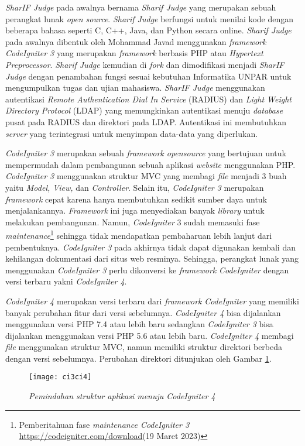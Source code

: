 \textit{SharIF Judge} pada awalnya bernama \textit{Sharif Judge} yang merupakan sebuah perangkat lunak \textit{open source}. \textit{Sharif Judge} berfungsi untuk menilai kode dengan beberapa bahasa seperti C, C++, Java, dan Python secara online. \textit{Sharif Judge} pada awalnya dibentuk oleh Mohammad Javad menggunakan \textit{framework} \textit{CodeIgniter 3} yang merupakan \textit{framework} berbasis PHP atau \textit{Hypertext Preprocessor}. \textit{Sharif Judge} kemudian di \textit{fork} dan dimodifikasi menjadi \textit{SharIF Judge} dengan penambahan fungsi sesuai kebutuhan Informatika UNPAR untuk mengumpulkan tugas dan ujian mahasiswa. \textit{SharIF Judge} menggunakan autentikasi \textit{Remote Authentication Dial In Service} (RADIUS) dan \textit{Light Weight Directory Protocol} (LDAP) yang memungkinkan autentikasi menuju \textit{database} pusat pada RADIUS dan direktori pada LDAP. Autentikasi ini membutuhkan \textit{server} yang terintegrasi untuk menyimpan data-data yang diperlukan.

\textit{CodeIgniter 3} merupakan sebuah \textit{framework opensource} yang bertujuan untuk mempermudah dalam pembangunan sebuah aplikasi \textit{website} menggunakan PHP. \textit{CodeIgniter 3} menggunakan struktur MVC yang membagi \textit{file} menjadi 3 buah yaitu \textit{Model, View,} dan \textit{Controller}. Selain itu, \textit{CodeIgniter 3} merupakan \textit{framework} cepat karena hanya membutuhkan sedikit sumber daya untuk menjalankannya. \textit{Framework} ini juga menyediakan banyak \textit{library} untuk melakukan pembangunan\cite{ci3:22}. Namun, \textit{CodeIgniter} 3 sudah memasuki fase \textit{maintenance}\footnote{Pemberitahuan fase \textit{maintenance CodeIgniter 3} \url{https://codeigniter.com/download}(19 Maret 2023)} sehingga tidak mendapatkan pembaharuan lebih lanjut dari pembentuknya. \textit{CodeIgniter 3} pada akhirnya tidak dapat digunakan kembali dan kehilangan dokumentasi dari situs web resminya. Sehingga, perangkat lunak yang menggunakan \textit{CodeIgniter 3} perlu dikonversi ke \textit{framework} \textit{CodeIgniter} dengan versi terbaru yakni \textit{CodeIgniter 4}.

\textit{CodeIgniter 4} merupakan versi terbaru dari \textit{framework} \textit{CodeIgniter} yang memiliki banyak perubahan fitur dari versi sebelumnya. \textit{CodeIgniter 4} bisa dijalankan menggunakan versi PHP 7.4 atau lebih baru sedangkan \textit{CodeIgniter 3} bisa dijalankan menggunakan versi PHP 5.6 atau lebih baru. \textit{CodeIgniter 4} membagi \textit{file} menggunakan struktur MVC, namun memiliki struktur direktori berbeda dengan versi sebelumnya\cite{codeigniter:23:ci4}. Perubahan direktori ditunjukan oleh Gambar \ref{fig:dirMappingBab1}.
\begin{figure}[H]
	\centering  
	\texttt{[image: ci3ci4]}  
	\caption[\textit{Pemindahan struktur aplikasi menuju \textit{CodeIgniter 4}}]{\textit{Pemindahan struktur aplikasi menuju \textit{CodeIgniter 4}}} 
	\label{fig:dirMappingBab1} 
\end{figure}

